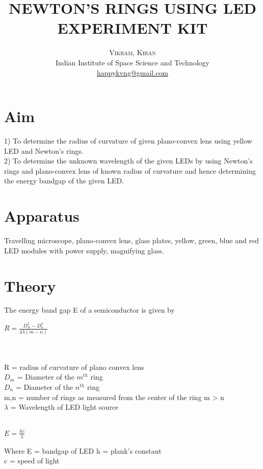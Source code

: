 \documentclass[twoside,twocolumn]{article}
\title{NEWTON'S RINGS USING LED EXPERIMENT KIT} %
\author{%
\textsc{Vikram, Kiran} \\ %
\normalsize Indian Institute of Space Science and Technology \\ %
\normalsize \href{mailto:happykvng@gmail.com}{happykvng@gmail.com} %
}
\date{} %
\begin{document}
\maketitle


\section{Aim}


1) To determine the radius of curvature of given plano-convex lens using yellow LED and Newton's rings.\\
2) To determine the unknown wavelength of the given LEDs by using Newton's rings and plano-convex lens of known radius of curvature and hence determining the energy bandgap of the given LED.



\section{Apparatus}

Travelling microscope, plano-convex lens, glass plates, yellow, green, blue and red LED modules with power supply, magnifying glass. 


\section{Theory}

The energy band gap E of a semiconductor is given by \\
\centerline{$ R  = \frac{D_{m}^{2}-D_{n}^{2}}{4 \lambda (m-n)}$} \\
\\ 
R = radius of curvature of plano convex lens\\
$D_{m}$ = Diameter of the $m^{th}$ ring\\
$D_{n}$ = Diameter of the $n^{th}$ ring\\
m,n = number of rings as measured from the center of the ring m > n\\
$\lambda$ = Wavelength of LED light source\\
\\
\centerline{$ E = \frac{hc}{\lambda}$}
Where E = bandgap of LED
h = plank's constant \\ 
c = speed of light\\
\end{document}
